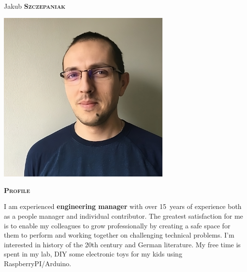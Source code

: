 \documentclass[11pt, a4paper]{article}
\newcommand{\headleft}[1]{\vspace*{3ex}\textsc{\textbf{#1}}\par%
    \vspace*{-1.5ex}\hrulefill\par\vspace*{0.7ex}}
\begin{document}
\setlength{\topskip}{0pt}
\setlength{\parindent}{0pt}
\setlength{\parskip}{0pt}
\setlength{\fboxsep}{0pt}
\pagestyle{empty}
\raggedbottom

\begin{minipage}[t]{0.33\textwidth} %
\colorbox{cvblue}{\begin{minipage}[t][5mm][t]{\textwidth}\null\hfill\null\end{minipage}}

\vspace{-.2ex} %
\colorbox{cvblue!90}{\color{white}  %
\textwidth\relax%
\begin{minipage}[t][293mm][t]{0.82\textwidth}
\raggedright
\vspace*{2.5ex}

\Large Jakub \textbf{\textsc{Szczepaniak}} \normalsize 

\null\hfill\includegraphics[width=0.65\textwidth]{photo.jpeg}\hfill\null

\vspace*{0.5ex} %

\headleft{Profile}
I am experienced \textbf{engineering manager} with over 15~years of experience both as a people manager and individual contributor.
The greatest satisfaction for me is to enable my colleagues to grow professionally by creating a safe space for them to perform and working together on challenging technical problems.
I'm interested in history of the 20th century and German literature.
My free time is spent in my lab, DIY some electronic toys for my kids using RaspberryPI/Arduino.


\end{minipage}}
\end{minipage}
\end{document}
